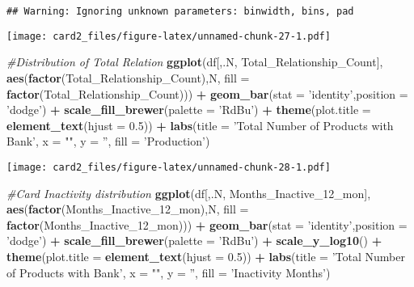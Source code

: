 \documentclass[]{article}
\newenvironment{Shaded}{\begin{snugshade}}{\end{snugshade}}
\newcommand{\CommentTok}[1]{\textcolor[rgb]{0.56,0.35,0.01}{\textit{#1}}}
\newcommand{\DataTypeTok}[1]{\textcolor[rgb]{0.13,0.29,0.53}{#1}}
\newcommand{\DecValTok}[1]{\textcolor[rgb]{0.00,0.00,0.81}{#1}}
\newcommand{\FloatTok}[1]{\textcolor[rgb]{0.00,0.00,0.81}{#1}}
\newcommand{\KeywordTok}[1]{\textcolor[rgb]{0.13,0.29,0.53}{\textbf{#1}}}
\newcommand{\NormalTok}[1]{#1}
\newcommand{\OperatorTok}[1]{\textcolor[rgb]{0.81,0.36,0.00}{\textbf{#1}}}
\newcommand{\StringTok}[1]{\textcolor[rgb]{0.31,0.60,0.02}{#1}}
\begin{document}
\begin{verbatim}
## Warning: Ignoring unknown parameters: binwidth, bins, pad
\end{verbatim}

\texttt{[image: card2\_files/figure-latex/unnamed-chunk-27-1.pdf]}

\begin{Shaded}
\begin{Highlighting}[]
\CommentTok{#Distribution of Total Relation}
\KeywordTok{ggplot}\NormalTok{(df[,.N, Total_Relationship_Count], }\KeywordTok{aes}\NormalTok{(}\KeywordTok{factor}\NormalTok{(Total_Relationship_Count),N, }\DataTypeTok{fill =} \KeywordTok{factor}\NormalTok{(Total_Relationship_Count))) }\OperatorTok{+}\StringTok{ }
\StringTok{  }\KeywordTok{geom_bar}\NormalTok{(}\DataTypeTok{stat =} \StringTok{'identity'}\NormalTok{,}\DataTypeTok{position =} \StringTok{'dodge'}\NormalTok{) }\OperatorTok{+}\StringTok{ }\KeywordTok{scale_fill_brewer}\NormalTok{(}\DataTypeTok{palette =} \StringTok{'RdBu'}\NormalTok{) }\OperatorTok{+}\StringTok{ }
\StringTok{  }\KeywordTok{theme}\NormalTok{(}\DataTypeTok{plot.title =} \KeywordTok{element_text}\NormalTok{(}\DataTypeTok{hjust =} \FloatTok{0.5}\NormalTok{)) }\OperatorTok{+}\StringTok{ }\KeywordTok{labs}\NormalTok{(}\DataTypeTok{title =} \StringTok{'Total Number of Products with Bank'}\NormalTok{, }
                                                       \DataTypeTok{x =} \StringTok{""}\NormalTok{, }\DataTypeTok{y =} \StringTok{''}\NormalTok{, }\DataTypeTok{fill =} \StringTok{'Production'}\NormalTok{) }
\end{Highlighting}
\end{Shaded}

\texttt{[image: card2\_files/figure-latex/unnamed-chunk-28-1.pdf]}

\begin{Shaded}
\begin{Highlighting}[]
\CommentTok{#Card Inactivity distribution }
\KeywordTok{ggplot}\NormalTok{(df[,.N, Months_Inactive_}\DecValTok{12}\NormalTok{_mon], }\KeywordTok{aes}\NormalTok{(}\KeywordTok{factor}\NormalTok{(Months_Inactive_}\DecValTok{12}\NormalTok{_mon),N, }\DataTypeTok{fill =} \KeywordTok{factor}\NormalTok{(Months_Inactive_}\DecValTok{12}\NormalTok{_mon))) }\OperatorTok{+}\StringTok{ }
\StringTok{  }\KeywordTok{geom_bar}\NormalTok{(}\DataTypeTok{stat =} \StringTok{'identity'}\NormalTok{,}\DataTypeTok{position =} \StringTok{'dodge'}\NormalTok{) }\OperatorTok{+}\StringTok{ }\KeywordTok{scale_fill_brewer}\NormalTok{(}\DataTypeTok{palette =} \StringTok{'RdBu'}\NormalTok{) }\OperatorTok{+}\StringTok{ }\KeywordTok{scale_y_log10}\NormalTok{() }\OperatorTok{+}
\StringTok{  }\KeywordTok{theme}\NormalTok{(}\DataTypeTok{plot.title =} \KeywordTok{element_text}\NormalTok{(}\DataTypeTok{hjust =} \FloatTok{0.5}\NormalTok{)) }\OperatorTok{+}\StringTok{ }\KeywordTok{labs}\NormalTok{(}\DataTypeTok{title =} \StringTok{'Total Number of Products with Bank'}\NormalTok{, }
                                                       \DataTypeTok{x =} \StringTok{""}\NormalTok{, }\DataTypeTok{y =} \StringTok{''}\NormalTok{, }\DataTypeTok{fill =} \StringTok{'Inactivity Months'}\NormalTok{)}
\end{Highlighting}
\end{Shaded}
\end{document}
